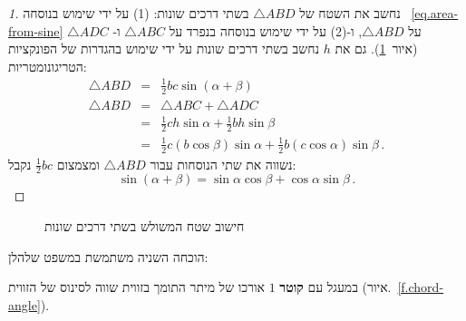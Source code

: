 \begin{proof}[1]
נחשב את השטח של 
$\triangle ABD$
בשתי דרכים שונות: (1) על ידי שימוש בנוסחה%
~\ref{eq.area-from-sine}
על 
$\triangle ABD$,
ו-(2) על ידי שימוש בנוסחה בנפרד על 
$\triangle ABC$
ו-%
$\triangle ADC$ (איור~\ref{f.sin-sum2}).
גם את
$h$
נחשב בשתי דרכים שונות על ידי שימוש בהגדרות של הפונקציות הטריגונומטריות:
\begin{eqnarray*}
\triangle ABD &=& \frac{1}{2}bc\sin(\alpha+\beta)\\
\triangle ABD &=& \triangle ABC+\triangle ADC\\
&=& \frac{1}{2}ch\sin \alpha + \frac{1}{2}bh\sin \beta\\
&=& \frac{1}{2}c(b\cos\beta)\sin \alpha + \frac{1}{2}b(c\cos\alpha)\sin \beta\,.
\end{eqnarray*}
נשווה את שתי הנוסחות עבור 
$\triangle ABD$
ומצמצום 
$\frac{1}{2}bc$
נקבל:
\[
\sin(\alpha+\beta)=\sin\alpha\cos\beta+\cos \alpha\sin\beta\,.
\]
\end{proof}

\begin{figure}[tb]
\begin{center}
\end{center}
\caption{חישוב שטח המשולש בשתי דרכים שונות}\label{f.sin-sum2}
\end{figure}
הוכחה השניה משתמשת במשפט שלהלן:
\begin{theorem}
במעגל עם 
\textbf{קוטר}
$1$
אורכו של מיתר התומך בזווית שווה לסינוס של הזווית
(איור.~\ref{f.chord-angle}).
\end{theorem}

